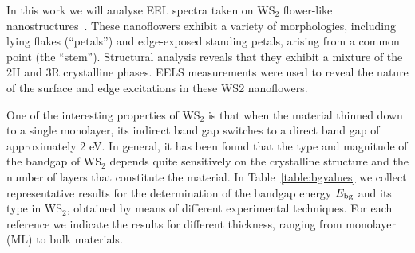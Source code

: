 In this work we will analyse EEL spectra taken on WS$_2$ flower-like nanostructures~\cite{SabryaWS2}.
%
These nanoflowers  exhibit a  variety of morphologies, including lying flakes (“petals”) and
edge-exposed standing petals, arising from a common point (the “stem”).
%
 Structural analysis reveals that they exhibit a mixture of the 2H and 3R crystalline phases. 
%
EELS measurements were used to reveal the nature of the surface and edge excitations in these WS2 nanoflowers.

One of the interesting properties of  WS$_2$ is
that when the material
thinned down to a single monolayer, its indirect band gap switches to a direct band gap of approximately 2 eV.
%
In general, it has been found that the type and magnitude of the bandgap
of WS$_2$ depends quite sensitively on the crystalline structure and
the number of layers that constitute the material.
%
In Table~\ref{table:bgvalues} we collect
representative results for the determination of the bandgap energy $E_{\rm bg}$
and its type in WS$_2$, obtained by means of different experimental techniques.
%
For each reference we indicate the results for different thickness, ranging from monolayer (ML)
to bulk materials.

